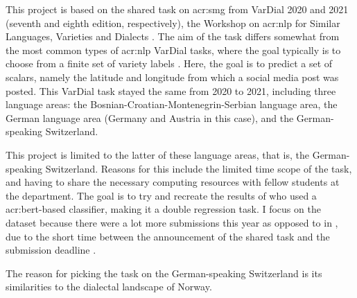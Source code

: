 \begin{comment}
The introduction can also briefly describe what methodology you will apply to reach the goal and the reasons for this choice of research methodology.
It can furthermore provide a brief summary of the main contributions of the work,
and should provide the reader with an overview of what is coming in the next sections.
You want to say more than what is explicit in the section names, if possible, but still keep the description short and to the point.
\end{comment}

This project is based on the shared task on \gls{acr:smg} from VarDial 2020 and 2021 (seventh and eighth edition, respectively), the Workshop on \gls{acr:nlp} for Similar Languages, Varieties and Dialects \citep{gamanReportVarDialEvaluation2020, chakravarthiFindingsVarDialEvaluation2021}. The aim of the task differs somewhat from the most common types of \gls{acr:nlp} VarDial tasks, where the goal typically is to choose from a finite set of variety labels \citep[1]{scherrerSocialMediaVariety2021}. Here, the goal is to predict a set of scalars, namely the latitude and longitude from which a social media post was posted. This VarDial task stayed the same from 2020 to 2021, including three language areas: the Bosnian-Croatian-Montenegrin-Serbian language area, the German language area (Germany and Austria in this case), and the German-speaking Switzerland.

This project is limited to the latter of these language areas, that is, the German-speaking Switzerland. Reasons for this include the limited time scope of the task, and having to share the necessary computing resources with fellow students at the department. The goal is to try and recreate the results of \cite{scherrerHeLjuVarDial20202020} who used a \acrshort{acr:bert}-based classifier, making it a double regression task. I focus on the \citeyear{scherrerHeLjuVarDial20202020} dataset because there were a lot more submissions this year as opposed to in \citeyear{scherrerSocialMediaVariety2021}, due to the short time between the announcement of the shared task and the submission deadline \citep[6]{chakravarthiFindingsVarDialEvaluation2021}.

The reason for picking the task on the German-speaking Switzerland is its similarities to the dialectal landscape of Norway.